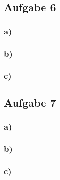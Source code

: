 \documentclass[11pt]{article}
\begin{document}
\subsection*{Aufgabe 6}
\subsubsection*{a)}

\subsubsection*{b)}

\subsubsection*{c)}

\subsection*{Aufgabe 7}
\subsubsection*{a)}

\subsubsection*{b)}

\subsubsection*{c)}
\end{document}
